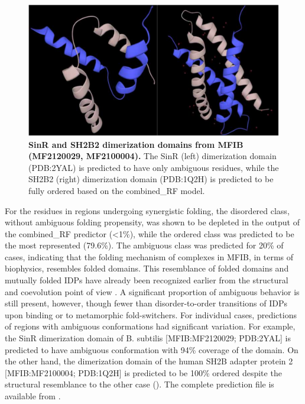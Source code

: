 \begin{figure}[tbh]
    \centering
    \includegraphics[width=\linewidth]{ambiguous//figures_ambiguous/fig4.pdf}
    \caption{\textbf{SinR and SH2B2 dimerization domains from MFIB (MF2120029, MF2100004).} The SinR (left) dimerization domain (PDB:2YAL) is predicted to have only ambiguous residues, while the SH2B2 (right) dimerization domain (PDB:1Q2H) is predicted to be fully ordered based on the combined_RF model.}
    \label{fig:chapter5:fig4}
\end{figure}

For the residues in regions undergoing synergistic folding, the disordered class, without ambiguous folding propensity, was shown to be depleted in the output of the combined_RF predictor (<1\%), while the ordered class was predicted to be the most represented (79.6\%). The ambiguous class was predicted for 20\% of cases, indicating that the folding mechanism of complexes in MFIB, in terms of biophysics, resembles folded domains. This resemblance of folded domains and mutually folded IDPs have already been recognized earlier from the structural and coevolution point of view \cite{iserte_chasing_2020}. A significant proportion of ambiguous behavior is still present, however, though fewer than disorder-to-order transitions of IDPs upon binding or to metamorphic fold-switchers. For individual cases, predictions of regions with ambiguous conformations had significant variation. For example, the SinR dimerization domain of B. subtilis [MFIB:MF2120029; PDB:2YAL] is predicted to have ambiguous conformation with 94\% coverage of the domain. On the other hand, the dimerization domain of the human SH2B adapter protein 2 [MFIB:MF2100004; PDB:1Q2H] is predicted to be 100\% ordered despite the structural resemblance to the other case (). The complete prediction file is available from .



